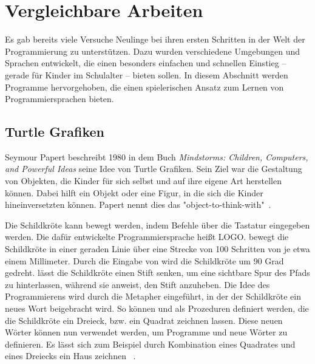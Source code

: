 \chapter{Vergleichbare Arbeiten}
\label{sec:related}

Es gab bereits viele Versuche Neulinge bei ihren ersten Schritten in der Welt der Programmierung zu unterstützen. Dazu wurden verschiedene Umgebungen und Sprachen entwickelt, die einen besonders einfachen und schnellen Einstieg -- gerade für Kinder im Schulalter -- bieten sollen. In diesem Abschnitt werden Programme hervorgehoben, die einen spielerischen Ansatz zum Lernen von Programmiersprachen bieten.

\section{Turtle Grafiken}
\label{sec:related:turtle}

Seymour Papert beschreibt 1980 in dem Buch \textit{Mindstorms: Children, Computers, and Powerful Ideas} seine Idee von Turtle Grafiken. Sein Ziel war die Gestaltung von Objekten, die Kinder für sich selbst und auf ihre eigene Art herstellen können. Dabei hilft ein Objekt oder eine Figur, in die sich die Kinder hineinversetzten können. Papert nennt dies das "object-to-think-with"~\cite[11]{papert1980}.

Die Schildkröte kann bewegt werden, indem Befehle über die Tastatur eingegeben werden. Die dafür entwickelte Programmiersprache heißt LOGO.  bewegt die Schildkröte in einer geraden Linie über eine Strecke von 100 Schritten von je etwa einem Millimeter. Durch die Eingabe von  wird die Schildkröte um 90 Grad gedreht.  lässt die Schildkröte einen Stift senken, um eine sichtbare Spur des Pfads zu hinterlassen, während  sie anweist, den Stift anzuheben. Die Idee des Programmierens wird durch die Metapher eingeführt, in der der Schildkröte ein neues Wort beigebracht wird. So können   und   als Prozeduren definiert werden, die die Schildkröte ein Dreieck, bzw. ein Quadrat zeichnen lassen. Diese neuen Wörter können nun verwendet werden, um Programme und neue Wörter zu definieren. Es lässt sich zum Beispiel durch Kombination eines Quadrates und eines Dreiecks ein Haus zeichnen ~\cite[12]{papert1980}.

